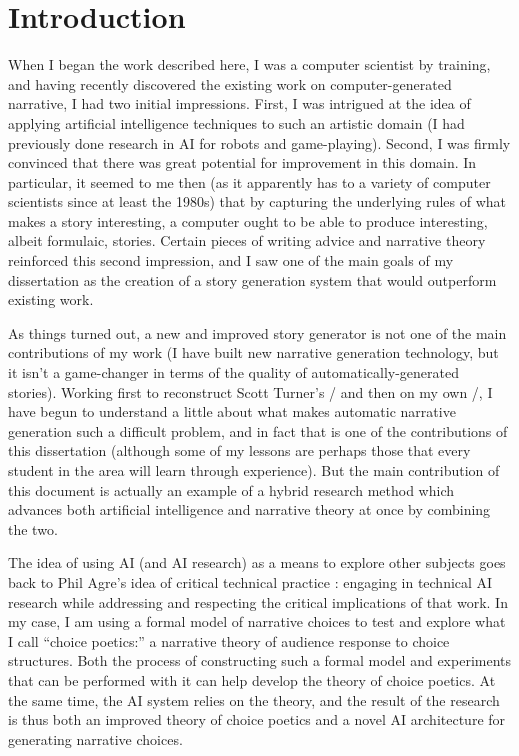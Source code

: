 \chapter{Introduction}

\label{ch:intro}

When I began the work described here, I was a computer scientist by training, and having recently discovered the existing work on computer-generated narrative, I had two initial impressions.
%
First, I was intrigued at the idea of applying artificial intelligence techniques to such an artistic domain (I had previously done research in AI for robots and game-playing).
%
Second, I was firmly convinced that there was great potential for improvement in this domain.
%
In particular, it seemed to me then (as it apparently has to a variety of computer scientists since at least the 1980s) that by capturing the underlying rules of what makes a story interesting, a computer ought to be able to produce interesting, albeit formulaic, stories.
%
Certain pieces of writing advice and narrative theory reinforced this second impression, and I saw one of the main goals of my dissertation as the creation of a story generation system that would outperform existing work.


As things turned out, a new and improved story generator is not one of the main contributions of my work (I have built new narrative generation technology, but it isn't a game-changer in terms of the quality of automatically-generated stories).
%
Working first to reconstruct Scott Turner's \minstrel/ \citep{Turner1993} and then on my own \dunyazad/, I have begun to understand a little about what makes automatic narrative generation such a difficult problem, and in fact that is one of the contributions of this dissertation (although some of my lessons are perhaps those that every student in the area will learn through experience).
%
But the main contribution of this document is actually an example of a hybrid research method which advances both artificial intelligence and narrative theory at once by combining the two.


The idea of using AI (and AI research) as a means to explore other subjects goes back to Phil Agre's idea of critical technical practice \citep{Agre1997}: engaging in technical AI research while addressing and respecting the critical implications of that work.
%
In my case, I am using a formal model of narrative choices to test and explore what I call ``choice poetics:'' a narrative theory of audience response to choice structures.
%
Both the process of constructing such a formal model and experiments that can be performed with it can help develop the theory of choice poetics.
%
At the same time, the AI system relies on the theory, and the result of the research is thus both an improved theory of choice poetics and a novel AI architecture for generating narrative choices.


